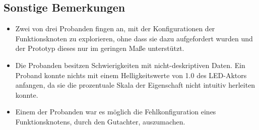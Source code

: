 \subsection*{Sonstige Bemerkungen} 
\begin{itemize}
    \item Zwei von drei Probanden fingen an, mit der Konfigurationen der Funktionsknoten zu explorieren, ohne dass sie dazu aufgefordert wurden und der Prototyp dieses nur im geringen Maße unterstützt.
    \item Die Probanden besitzen Schwierigkeiten mit nicht-deskriptiven Daten. Ein Proband konnte nichts mit einem Helligkeitswerte von 1.0 des LED-Aktors anfangen, da sie die prozentuale Skala der Eigenschaft nicht intuitiv herleiten konnte.
    \item Einem der Probanden war es möglich die Fehlkonfiguration eines Funktionsknotens, durch den Gutachter, auszumachen.
\end{itemize}
